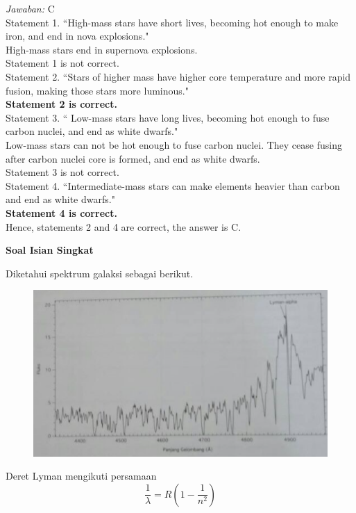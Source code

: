 \documentclass[11pt,fleqn]{exam}
\begin{document}
\begin{questions}
\textit{Jawaban: }C\\
Statement 1. ``High-mass stars have short lives, becoming hot enough to make iron, and end in nova explosions."\\
High-mass stars end in supernova explosions.\\
Statement 1 is not correct.\\
Statement 2. ``Stars of higher mass have higher core temperature and more rapid fusion, making those stars more luminous."\\
\textbf{Statement 2 is correct.}\\
Statement 3. `` Low-mass stars have long lives, becoming hot enough to fuse carbon nuclei, and end as white dwarfs."\\
Low-mass stars can not be hot enough to fuse carbon nuclei. They cease fusing after carbon nuclei core is formed, and end as white dwarfs.\\
Statement 3 is not correct.\\
Statement 4. ``Intermediate-mass stars can make elements heavier than carbon and end as white dwarfs."\\
\textbf{Statement 4 is correct.}\\
Hence, statements 2 and 4 are correct, the answer is C.


\vspace{0.5cm}
\textbf{Soal Isian Singkat}

\question Diketahui spektrum galaksi sebagai berikut.
\begin{figure}[h!]
\centering
\includegraphics[scale=1]{spektrumgalaksi.PNG}
\end{figure}

Deret Lyman mengikuti persamaan
\begin{equation*}
\frac{1}{\lambda}=R(1-\frac{1}{n^2})
\end{equation*}


\end{questions}
\end{document}
